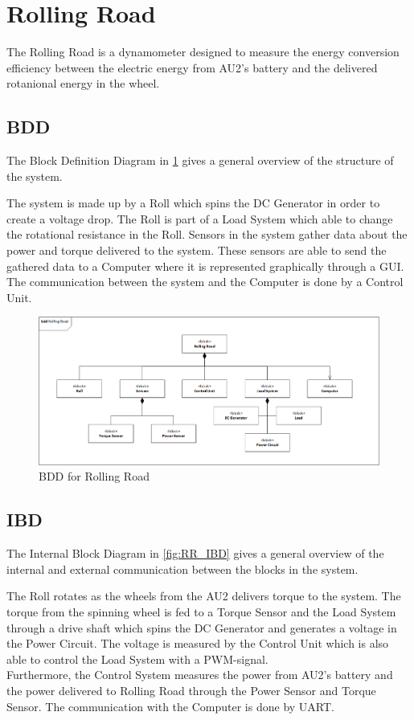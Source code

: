 \section{Rolling Road}
The Rolling Road is a dynamometer designed to measure the energy conversion efficiency  between the electric energy from AU2's battery and the delivered rotanional energy in the wheel.

\subsection{BDD}
The Block Definition Diagram in \ref{fig:RR_BDD} gives a general overview of the structure of the system.

The system is made up by a Roll which spins the DC Generator in order to create a voltage drop. The Roll is part of a Load System which able to change the rotational resistance in the Roll.
Sensors in the system gather data about the power and torque delivered to the system. These sensors are able to send the gathered data to a Computer where it is represented graphically through a GUI. The communication between the system and the Computer is done by a Control Unit.

\begin{figure}[H]
	\centering
	\includegraphics[width=0.9\linewidth]{Architecture/BDD_RollingRoad}
	\caption{BDD for Rolling Road}
	\label{fig:RR_BDD}
\end{figure}

\subsection{IBD}
The Internal Block Diagram in \ref{fig:RR_IBD} gives a general overview of the internal and external communication between the blocks in the system.

The Roll rotates as the wheels from the AU2 delivers torque to the system. The torque from the spinning wheel is fed to a Torque Sensor and the Load System through a drive shaft which spins the DC Generator and generates a voltage in the Power Circuit. The voltage is measured by the Control Unit which is also able to control the Load System with a PWM-signal.\\
Furthermore, the Control System measures the power from AU2's battery and the power delivered to Rolling Road through the Power Sensor and Torque Sensor. The communication with the Computer is done by UART.

